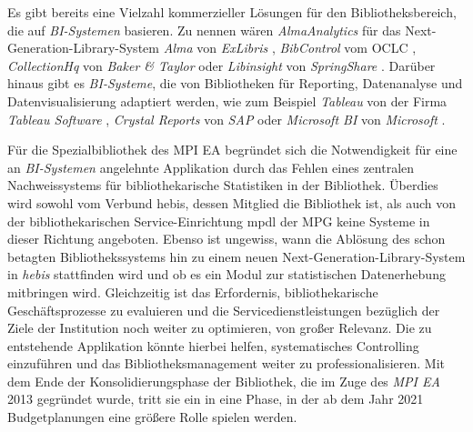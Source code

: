 Es gibt bereits eine Vielzahl kommerzieller Lösungen für den Bibliotheksbereich, die auf \textit{\acrshort{BI}-Systemen} basieren.
Zu nennen wären \textit{AlmaAnalytics} für das Next-Generation-Library-System \textit{Alma} von \textit{ExLibris} \cite[vgl.][]{ex_libris_alma_2020},
\textit{BibControl} vom \acrfull{OCLC} \cite[vgl.][]{oclc_bibcontrol_2020},
\textit{CollectionHq} von \textit{Baker \& Taylor} \cite[vgl.][]{baker__taylor_select_2020} oder \textit{Libinsight} von \textit{SpringShare} \cite[vgl.][]{springShare_libinsight_2020}.
Darüber hinaus gibt es \textit{\acrlong{BI}-Systeme}, die von Bibliotheken für Reporting, Datenanalyse und Datenvisualisierung adaptiert werden,
wie zum Beispiel \textit{Tableau} von der Firma \textit{Tableau Software} \cite[vgl.][]{tableau_software_software_2020},
\textit{Crystal Reports} von \textit{SAP} \cite[vgl.][]{sap_pixel-perfect_2020} oder \textit{Microsoft BI} von \textit{Microsoft} \cite[vgl.][]{microsoft_datenvisualisierung_2020}.

Für die Spezialbibliothek des \acrfull{MPI EA} begründet sich die Notwendigkeit für eine an \textit{\acrshort{BI}-Systemen} angelehnte Applikation durch das
Fehlen eines zentralen Nachweissystems für bibliothekarische
Statistiken in der Bibliothek. Überdies wird sowohl vom Verbund \acrfull{hebis}, dessen Mitglied die Bibliothek ist, als auch 
von der bibliothekarischen Service-Einrichtung \acrfull{mpdl} der \acrfull{MPG} keine Systeme in dieser Richtung angeboten. Ebenso ist ungewiss, wann die Ablösung des schon betagten Bibliothekssystems hin zu 
einem neuen Next-Generation-Library-System in \textit{\acrshort{hebis}} stattfinden wird und ob
es ein Modul zur statistischen Datenerhebung mitbringen wird. 
Gleichzeitig ist das Erfordernis, bibliothekarische Geschäftsprozesse zu evaluieren und die
Servicedienstleistungen bezüglich der Ziele der Institution noch weiter zu
optimieren, von großer Relevanz. 
Die zu entstehende Applikation könnte hierbei helfen, systematisches Controlling einzuführen und das
Bibliotheksmanagement weiter zu professionalisieren.
Mit dem Ende der Konsolidierungsphase der
Bibliothek, die im Zuge des \textit{\acrshort{MPI EA}} 2013 gegründet wurde, tritt sie ein in eine Phase, in der ab dem Jahr
2021 Budgetplanungen eine größere Rolle spielen werden.


